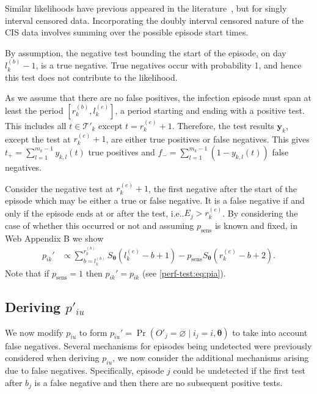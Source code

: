 \documentclass[referee,useAMS,usenatbib]{biom}
\makeatletter
\DeclareMathOperator{\prob}{\mathrm{Pr}}
\renewcommand{\vec}[1]{\bm{#1}}
\newcommand{\psens}{p_\text{sens}}
\newcommand{\sched}{\mathcal{T}}
\DeclareRobustCommand\onedot{\futurelet\@let@token\@onedot}
\def\@onedot{\ifx\@let@token.\else.\null\fi\xspace}
\def\ie{i.e\onedot} \def\Ie{{I.e}\onedot}
\makeatother
\begin{document}
Similar likelihoods have previous appeared in the literature~\citep[e.g.][eq.\ (2)]{piresIntervalMisclassify}, but for singly interval censored data.
Incorporating the doubly interval censored nature of the CIS data involves summing over the possible episode start times.


By assumption, the negative test bounding the start of the episode, on day $l_k^{(b)}-1$, is a true negative.
True negatives occur with probability 1, and hence this test does not contribute to the likelihood.

As we assume that there are no false positives, the infection episode must span at least the period $[r^{(b)}_k, l^{(e)}_k]$, a period starting and ending with a positive test.
This includes all $t \in \sched'_k$ except $t = r_k^{(e)}+1$.
Therefore, the test results $\vec{y}_k$, except the test at $r_k^{(e)}+1$, are either true positives or false negatives.
This gives $t_+ = \sum_{l=1}^{m_k-1} y_{k,l}(t)$ true positives and $f_- = \sum_{l=1}^{m_k-1} (1 - y_{k,l}(t))$ false negatives.

Consider the negative test at $r_k^{(e)}+1$, the first negative after the start of the episode which may be either a true or false negative.
It is a false negative if and only if the episode ends at or after the test, \ie $E_j > r_k^{(e)}$.
By considering the case of whether this occurred or not and assuming $\psens$ is known and fixed, in Web Appendix B we show
\begin{align}
p_{ik}'
&\propto \sum_{b = l_k^{(b)}}^{r_k^{(b)}} S_{\vec{\theta}}(l_k^{(e)} - b + 1) - p_\text{sens} S_{\vec{\theta}}(r_k^{(e)} - b + 2).
\label{imperf-test:eq:pia-prime-constant}
\end{align}
Note that if $p_\text{sens} = 1$ then $p_{ik}' = p_{ik}$ (see \cref{perf-test:eq:pia}).

\subsection{Deriving $p'_{iu}$} \label{imperf-test:sec:modifying-p_iu}

We now modify $p_{iu}$ to form $p_{iu}' = \prob(O'_j = \varnothing \mid i_j = i, \vec{\theta})$ to take into account false negatives.
Several mechanisms for episodes being undetected were previously considered when deriving $p_{iu}$, we now consider the additional mechanisms arising due to false negatives.
Specifically, episode $j$ could be undetected if the first test after $b_j$ is a false negative and then there are no subsequent positive tests.
\end{document}
